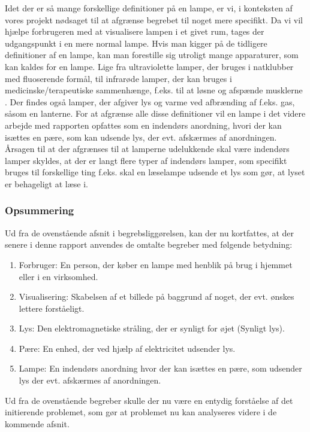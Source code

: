 Idet der er så mange forskellige definitioner på en lampe, er vi, i konteksten af vores projekt nødsaget til at afgrænse begrebet til noget mere specifikt. Da vi vil hjælpe forbrugeren med at visualisere lampen i et givet rum, tages der udgangspunkt i en mere normal lampe. Hvis man kigger på de tidligere definitioner af en lampe, kan man forestille sig utroligt mange apparaturer, som kan kaldes for en lampe. Lige fra ultraviolette lamper, der bruges i natklubber med fluoserende formål, til infrarøde lamper, der kan bruges i medicinske/terapeutiske sammenhænge, f.eks. til at løsne og afspænde musklerne \cite{lys_terapi}. Der findes også lamper, der afgiver lys og varme ved afbrænding af f.eks. gas, såsom en lanterne. For at afgrænse alle disse definitioner vil en lampe i det videre arbejde med rapporten opfattes som en indendørs anordning, hvori der kan isættes en pære, som kan udsende lys, der evt. afskærmes af anordningen. Årsagen til at der afgrænses til at lamperne udelukkende skal være indendørs lamper skyldes, at der er langt flere typer af indendørs lamper, som specifikt  bruges til forskellige ting f.eks. skal en læselampe udsende et lys som gør, at lyset er behageligt at læse i.


\subsubsection{Opsummering}
Ud fra de ovenstående afsnit i begrebsliggørelsen, kan der nu kortfattes, at der senere i denne rapport anvendes de omtalte begreber med følgende betydning:
\begin{enumerate}
	\item Forbruger: En person, der køber en lampe med henblik på brug i hjemmet eller i en virksomhed.
	\item Visualisering: Skabelsen af et billede på baggrund af noget, der evt. ønskes lettere forståeligt.
	\item Lys: Den elektromagnetiske stråling, der er synligt for øjet (Synligt lys).
	\item Pære: En enhed, der ved hjælp af elektricitet udsender lys.
	\item Lampe: En indendørs anordning hvor der kan isættes en pære, som udsender lys der evt. afskærmes af anordningen.
\end{enumerate}
Ud fra de ovenstående begreber skulle der nu være en entydig forståelse af det initierende problemet, som gør at problemet nu kan analyseres videre i de kommende afsnit.






